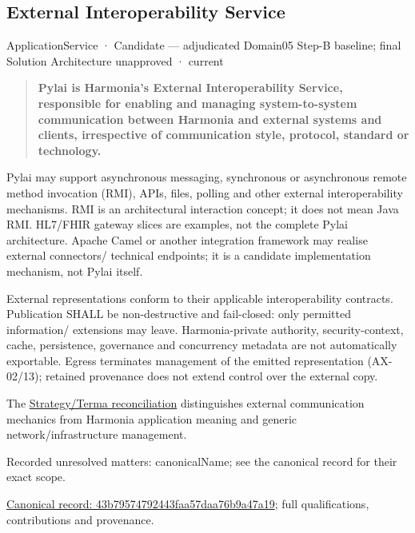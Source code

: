 \subsection{External Interoperability Service}

\label{element:43b79574792443faa57daa76b9a47a19}
{\small ApplicationService · Candidate — adjudicated Domain05 Step-B baseline; final Solution Architecture unapproved · current}\par

\begin{quote}


\textbf{Pylai is Harmonia's External Interoperability Service, responsible for enabling
and managing system-to-system communication between Harmonia and external systems
and clients, irrespective of communication style, protocol, standard or technology.}



\end{quote}


Pylai may support asynchronous messaging, synchronous or asynchronous remote
method invocation (RMI), APIs, files, polling and other external interoperability
mechanisms. RMI is an architectural interaction concept; it does not mean Java RMI.
HL7/FHIR gateway slices are examples, not the complete Pylai architecture.
Apache Camel or another integration framework may realise external connectors/
technical endpoints; it is a candidate implementation mechanism, not Pylai itself.



External representations conform to their applicable interoperability contracts.
Publication SHALL be non-destructive and fail-closed: only permitted information/
extensions may leave. Harmonia-private authority, security-context, cache,
persistence, governance and concurrency metadata are not automatically exportable.
Egress terminates management of the emitted representation (AX-02/13); retained
provenance does not extend control over the external copy.



The \href{\detokenize{../../../../../docs/markdown/05-information-systems-architecture/gaps.md#pylai-strategy-conflict}}{Strategy/Terma reconciliation} distinguishes
external communication mechanics from Harmonia application meaning and generic
network/infrastructure management.


{\small Recorded unresolved matters: canonicalName; see the canonical record for their exact scope.}\par
{\footnotesize \href{../../../../continuum/application/application-service/43b79574792443faa57daa76b9a47a19.md}{Canonical record: 43b79574792443faa57daa76b9a47a19}; full qualifications, contributions and provenance.}\par

